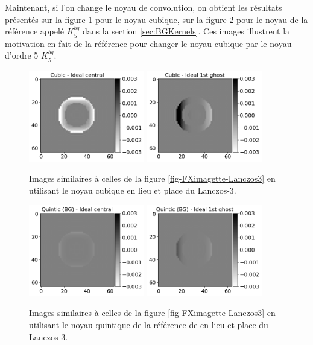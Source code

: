 \documentclass[11pt,twoside]{article}
\begin{document}
Maintenant, si l'on change le noyau de convolution, on obtient les résultats présentés sur la figure \ref{fig-FXimagette-cubique} pour le noyau cubique, sur la  figure \ref{fig-FXimagette-quinticBG} pour  le noyau de la référence \cite{2014PASP..126..287B} appelé $K_5^{bg}$ dans la section \ref{sec:BGKernels}. Ces images illustrent la motivation en fait de la référence \cite{2014PASP..126..287B} pour changer le noyau cubique par le noyau d'ordre 5 $K_5^{bg}$.
\begin{figure}
\centering
\includegraphics[width=0.45\textwidth]{fig22a.png}
\includegraphics[width=0.45\textwidth]{fig22b.png}
\caption{Images similaires à celles de la figure \ref{fig-FXimagette-Lanczos3} en utilisant le noyau cubique en lieu et place du Lanczos-3.}
\label{fig-FXimagette-cubique}
\end{figure}
%
\begin{figure}
\centering
\includegraphics[width=0.45\textwidth]{fig23a.png}
\includegraphics[width=0.45\textwidth]{fig23b.png}
\caption{Images similaires à celles de la figure \ref{fig-FXimagette-Lanczos3} en utilisant le noyau quintique  de la référence \cite{2014PASP..126..287B} de  en lieu et place du Lanczos-3.}
\label{fig-FXimagette-quinticBG}
\end{figure}
\end{document}
